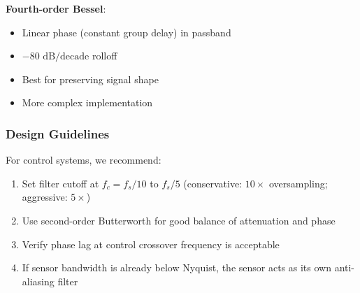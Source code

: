 \textbf{Fourth-order Bessel}:
\begin{itemize}
    \item Linear phase (constant group delay) in passband
    \item $-80\text{ dB/decade}$ rolloff
    \item Best for preserving signal shape
    \item More complex implementation
\end{itemize}

\subsubsection{Design Guidelines}

For control systems, we recommend:
\begin{enumerate}
    \item Set filter cutoff at $f_c = f_s/10$ to $f_s/5$ (conservative: $10\times$ oversampling; aggressive: $5\times$)
    \item Use second-order Butterworth for good balance of attenuation and phase
    \item Verify phase lag at control crossover frequency is acceptable
    \item If sensor bandwidth is already below Nyquist, the sensor acts as its own anti-aliasing filter
\end{enumerate}

